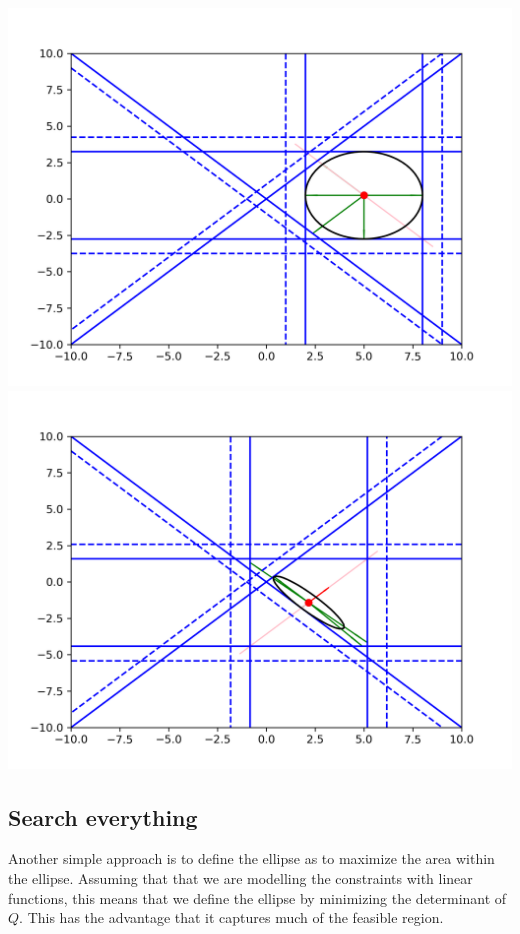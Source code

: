 \documentclass{article}
\begin{document}
\includegraphics[scale=0.2]{advantage_of_ellipse_1.png}
\includegraphics[scale=0.2]{advantage_of_ellipse_2.png}



\subsection{Search everything}
Another simple approach is to define the ellipse as to maximize the area within the ellipse.
Assuming that that we are modelling the constraints with linear functions, this means that we define the ellipse by minimizing the determinant of $Q$.
This has the advantage that it captures much of the feasible region.
\end{document}

